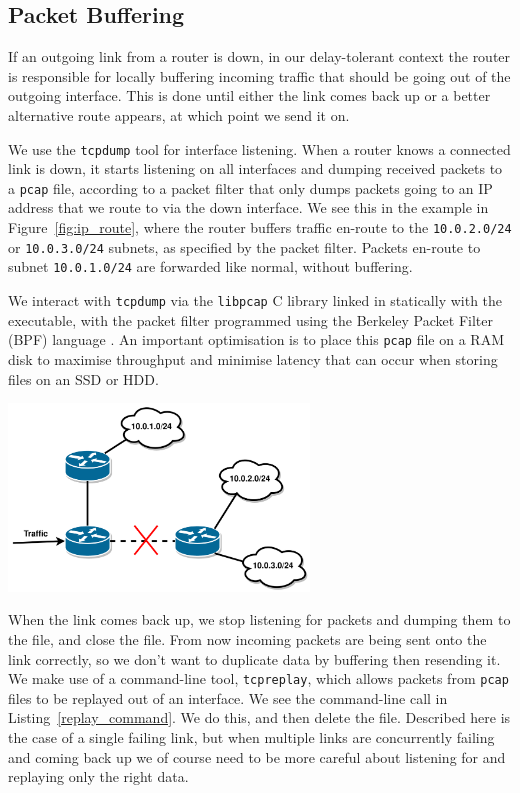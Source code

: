 \documentclass[withindex,glossary,openany]{cam-thesis}
\begin{document}
\subsection{Packet Buffering}

If an outgoing link from a router is down, in our delay-tolerant context the router is responsible for locally buffering incoming traffic that should be going out of the outgoing interface. This is done until either the link comes back up or a better alternative route appears, at which point we send it on.

We use the \texttt{tcpdump} tool for interface listening. When a router knows a connected link is down, it starts listening on all interfaces and dumping received packets to a \texttt{pcap} file, according to a packet filter that only dumps packets going to an IP address that we route to via the down interface. We see this in the example in Figure~\ref{fig:ip_route}, where the router buffers traffic en-route to the \texttt{10.0.2.0/24} or \texttt{10.0.3.0/24} subnets, as specified by the packet filter. Packets en-route to subnet \texttt{10.0.1.0/24} are forwarded like normal, without buffering.

We interact with \texttt{tcpdump} via the \texttt{libpcap} C library linked in statically with the executable, with the packet filter programmed using the Berkeley Packet Filter (BPF) language \cite{STEVEN1993}. An important optimisation is to place this \texttt{pcap} file on a RAM disk to maximise throughput and minimise latency that can occur when storing files on an SSD or HDD.

\begin{center}
\begin{minipage}{0.9\textwidth} \centering
	\includegraphics[width=0.6\textwidth]{ip_route}
	\label{fig:ip_route}
\end{minipage}
\end{center}

When the link comes back up, we stop listening for packets and dumping them to the file, and close the file. From now incoming packets are being sent onto the link correctly, so we don't want to duplicate data by buffering then resending it. We make use of a command-line tool, \texttt{tcpreplay}, which allows packets from \texttt{pcap} files to be replayed out of  an interface. We see the command-line call in Listing~\ref{replay_command}. We do this, and then delete the file. Described here is the case of a single failing link, but when multiple links are concurrently failing and coming back up we of course need to be more careful about listening for and replaying only the right data.
\end{document}
